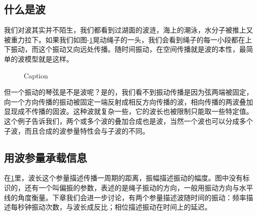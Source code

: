 \documentclass{ctexbook}
\begin{document}
\subsection{什么是波}
我们对波其实并不陌生，我们都看到过湖面的波涟，海上的潮泳，水分子被推上又被重力拉下。如果我们如图-\ref{string}晃动绳子的一头，我们会看到绳子的每一小段都在上下振动，而这个振动又向远处传播。随时间振动，在空间传播就是波的本性，最简单的波模型就是这样。
\begin{figure}\label{string}
    \centering
{}

    \caption{Caption}
\end{figure}

但一个振动的琴弦是不是波呢？是的，我们看不到振动传播是因为弦两端被固定，向一个方向传播的振动被固定一端反射成相反方向传播的波，相向传播的两波叠加显现成不传播的固波。这种波就复杂一些，它的波长也被限制只能取一些特定值。这个例子告诉我们，两个或多个波的叠加合成也是波，当然一个波也可以分成多个子波，而且合成的波参量特性会与子波的不同。

\subsection{用波参量承载信息}
在\ref{string}里，波长这个参量描述传播一周期的距离，振幅描述振动的幅度。图中没有标识的，还有一个叫偏振的参数，表述的是绳子振动的方向，一般用振动方向与水平线的角度衡量。下章我们会进一步讨论，有两个参量描述波随时间的振动：频率描述每秒钟振动次数，与波长成反比；相位描述振动在时间上的延迟。
\end{document}
